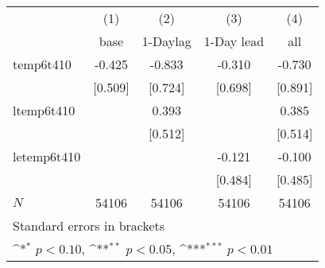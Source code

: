 {
\def\sym#1{\ifmmode^{#1}\else\(^{#1}\)\fi}
\begin{tabular}{l*{4}{c}}
\hline\hline
            &\multicolumn{1}{c}{(1)}&\multicolumn{1}{c}{(2)}&\multicolumn{1}{c}{(3)}&\multicolumn{1}{c}{(4)}\\
            &\multicolumn{1}{c}{base}&\multicolumn{1}{c}{1-Daylag}&\multicolumn{1}{c}{1-Day lead}&\multicolumn{1}{c}{all}\\
\hline
temp6t410   &      -0.425         &      -0.833         &      -0.310         &      -0.730         \\
            &     [0.509]         &     [0.724]         &     [0.698]         &     [0.891]         \\
[1em]
ltemp6t410  &                     &       0.393         &                     &       0.385         \\
            &                     &     [0.512]         &                     &     [0.514]         \\
[1em]
letemp6t410 &                     &                     &      -0.121         &      -0.100         \\
            &                     &                     &     [0.484]         &     [0.485]         \\
\hline
\(N\)       &       54106         &       54106         &       54106         &       54106         \\
\hline\hline
\multicolumn{5}{l}{\footnotesize Standard errors in brackets}\\
\multicolumn{5}{l}{\footnotesize \sym{*} \(p<0.10\), \sym{**} \(p<0.05\), \sym{***} \(p<0.01\)}\\
\end{tabular}
}
